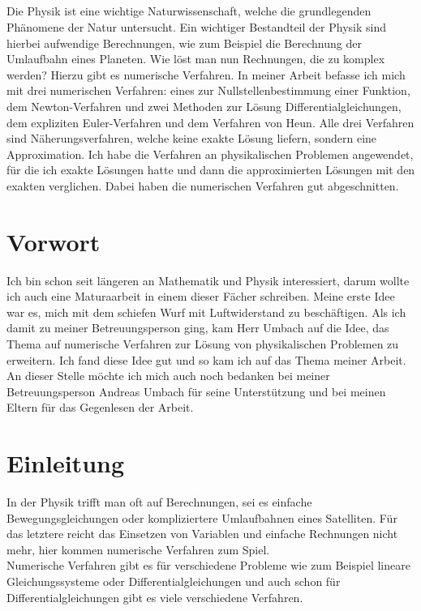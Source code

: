 \documentclass[a4paper,12pt]{report}
\makeatletter
\renewenvironment{abstract}{%
    \if@twocolumn
      \section*{\abstractname}%
    \else %
      \begin{center}%
        {\bfseries \LARGE\abstractname\vspace{\z@}}%
      \end{center}%
      \quotation
    \fi}
    {\if@twocolumn\else\endquotation\fi}
\makeatother
\begin{document}

\begin{abstract}
\noindent
Die Physik ist eine wichtige Naturwissenschaft, welche die grundlegenden Phänomene der Natur untersucht. Ein wichtiger Bestandteil der Physik sind hierbei aufwendige Berechnungen, wie zum Beispiel die Berechnung der Umlaufbahn eines Planeten. Wie löst man nun Rechnungen, die zu komplex werden? Hierzu gibt es numerische Verfahren. In meiner Arbeit befasse ich mich mit drei numerischen Verfahren: eines zur Nullstellenbestimmung einer Funktion, dem Newton-Verfahren und zwei Methoden zur Lösung Differentialgleichungen, dem expliziten Euler-Verfahren und dem Verfahren von Heun. Alle drei Verfahren sind Näherungsverfahren, welche keine exakte Lösung liefern, sondern eine Approximation. Ich habe die Verfahren an physikalischen Problemen angewendet, für die ich exakte Lösungen hatte und dann die approximierten Lösungen mit den exakten verglichen. Dabei haben die numerischen Verfahren gut abgeschnitten. 
\end{abstract}
\tableofcontents


\chapter{Vorwort}
Ich bin schon seit längeren an Mathematik und Physik interessiert, darum wollte ich auch eine Maturaarbeit in einem dieser Fächer schreiben. Meine erste Idee war es, mich mit dem schiefen Wurf mit Luftwiderstand zu beschäftigen. Als ich damit zu meiner Betreuungsperson ging, kam Herr Umbach auf die Idee, das Thema auf numerische Verfahren zur Lösung von physikalischen Problemen zu erweitern. Ich fand diese Idee gut und so kam ich auf das Thema meiner Arbeit. An dieser Stelle möchte ich mich auch noch bedanken bei  meiner Betreuungsperson Andreas Umbach für seine Unterstützung und  bei meinen Eltern für das Gegenlesen der Arbeit.

\chapter{Einleitung}
In der Physik trifft man oft auf Berechnungen, sei es einfache Bewegungsgleichungen oder kompliziertere Umlaufbahnen eines Satelliten. Für das letztere reicht das Einsetzen von Variablen und einfache Rechnungen nicht mehr, hier kommen numerische Verfahren zum Spiel.\\

\noindent
Numerische Verfahren gibt es für verschiedene Probleme wie zum Beispiel lineare Gleichungssysteme oder Differentialgleichungen und auch schon für Differentialgleichungen gibt es viele verschiedene Verfahren. \\
\end{document}
